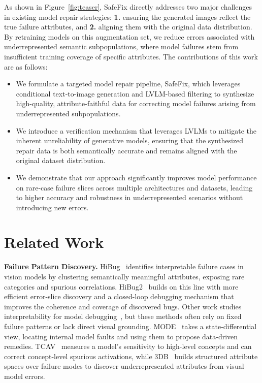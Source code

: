 \documentclass[10pt]{article} %
\newcommand{\model}{SafeFix\xspace}
\newcommand{\hibug}{HiBug\xspace}
\begin{document}
As shown in Figure~\ref{fig:teaser}, \model directly addresses two major challenges in existing model repair strategies: \textbf{1.} ensuring the generated images reflect the true failure attributes, and \textbf{2.} aligning them with the original data distribution. By retraining models on this augmentation set, we reduce errors associated with underrepresented semantic subpopulations, where model failures stem from insufficient training coverage of specific attributes. The contributions of this work are as follows:
\begin{itemize}
\item We formulate a targeted model repair pipeline, \model, which leverages conditional text-to-image generation and LVLM-based filtering to synthesize high-quality, attribute-faithful data for correcting model failures arising from underrepresented subpopulations.

\item We introduce a verification mechanism that leverages LVLMs to mitigate the inherent unreliability of generative models, ensuring that the synthesized repair data is both semantically accurate and remains aligned with the original dataset distribution.

\item We demonstrate that our approach significantly improves model performance on rare-case failure slices across multiple architectures and datasets, leading to higher accuracy and robustness in underrepresented scenarios without introducing new errors.
\end{itemize}

\section{Related Work}
\textbf{Failure Pattern Discovery.} \hibug~\citep{chen2023hibug} identifies interpretable failure cases in vision models by clustering semantically meaningful attributes, exposing rare categories and spurious correlations.
HiBug2~\citep{chen2025hibug2} builds on this line with more efficient error-slice discovery and a closed-loop debugging mechanism that improves the coherence and coverage of discovered bugs.
Other work studies interpretability for model debugging~\citep{adebayo2020debugging, adebayo2022posthoc}, but these methods often rely on fixed failure patterns or lack direct visual grounding.
MODE~\citep{vendrow2023dataset} takes a state-differential view, locating internal model faults and using them to propose data-driven remedies.
TCAV~\citep{kim2018tcav} measures a model's sensitivity to high-level concepts and can correct concept-level spurious activations, while 3DB~\citep{leclerc20223db} builds structured attribute spaces over failure modes to discover underrepresented attributes from visual model errors.
\end{document}
